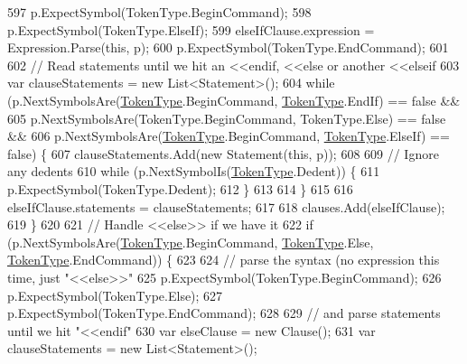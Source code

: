 \begin{DoxyCode}
597                     p.ExpectSymbol(TokenType.BeginCommand);
598                     p.ExpectSymbol(TokenType.ElseIf);
599                     elseIfClause.expression = Expression.Parse(\textcolor{keyword}{this}, p);
600                     p.ExpectSymbol(TokenType.EndCommand);
601 
602                     \textcolor{comment}{// Read statements until we hit an <<endif, <<else or another <<elseif}
603                     var clauseStatements = \textcolor{keyword}{new} List<Statement>();
604                     \textcolor{keywordflow}{while} (p.NextSymbolsAre(\hyperlink{a00053_a301aa7c866593a5b625a8fc158bbeace}{TokenType}.BeginCommand, 
      \hyperlink{a00053_a301aa7c866593a5b625a8fc158bbeace}{TokenType}.EndIf) == \textcolor{keyword}{false} &&
605                         p.NextSymbolsAre(TokenType.BeginCommand, TokenType.Else) == \textcolor{keyword}{false} &&
606                         p.NextSymbolsAre(\hyperlink{a00053_a301aa7c866593a5b625a8fc158bbeace}{TokenType}.BeginCommand, 
      \hyperlink{a00053_a301aa7c866593a5b625a8fc158bbeace}{TokenType}.ElseIf) == \textcolor{keyword}{false}) \{
607                         clauseStatements.Add(\textcolor{keyword}{new} Statement(\textcolor{keyword}{this}, p));
608 
609                         \textcolor{comment}{// Ignore any dedents}
610                         \textcolor{keywordflow}{while} (p.NextSymbolIs(\hyperlink{a00053_a301aa7c866593a5b625a8fc158bbeace}{TokenType}.Dedent)) \{
611                             p.ExpectSymbol(TokenType.Dedent);
612                         \}
613 
614                     \}
615 
616                     elseIfClause.statements = clauseStatements;
617 
618                     clauses.Add(elseIfClause);
619                 \}
620 
621                 \textcolor{comment}{// Handle <<else>> if we have it}
622                 \textcolor{keywordflow}{if} (p.NextSymbolsAre(\hyperlink{a00053_a301aa7c866593a5b625a8fc158bbeace}{TokenType}.BeginCommand, \hyperlink{a00053_a301aa7c866593a5b625a8fc158bbeace}{TokenType}.Else, 
      \hyperlink{a00053_a301aa7c866593a5b625a8fc158bbeace}{TokenType}.EndCommand)) \{
623 
624                     \textcolor{comment}{// parse the syntax (no expression this time, just "<<else>>"}
625                     p.ExpectSymbol(TokenType.BeginCommand);
626                     p.ExpectSymbol(TokenType.Else);
627                     p.ExpectSymbol(TokenType.EndCommand);
628 
629                     \textcolor{comment}{// and parse statements until we hit "<<endif"}
630                     var elseClause = \textcolor{keyword}{new} Clause();
631                     var clauseStatements = \textcolor{keyword}{new} List<Statement>();

\end{DoxyCode}
